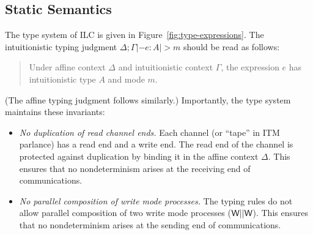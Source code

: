 %  

\subsection{Static Semantics}
\label{subsec:types}

%

The type system of ILC is given in Figure~\ref{fig:type-expressions}. The
intuitionistic typing judgment $\Delta ; \Gamma |- e : A |> m$ should be read as follows:
\begingroup
\addtolength\leftmargini{-.2in}
\begin{quote}
  Under affine context $\Delta$ and intuitionistic context $\Gamma$, the expression $e$
  has intuitionistic type $A$ and mode $m$.
\end{quote}
\endgroup
\noindent (The affine typing judgment follows similarly.) Importantly, the type
  system maintains these invariants:

\begin{comment}
Judgments have the form $\Delta ; \Gamma |- e : A |> m$, where $\Delta$ is an affine typing
context, $\Gamma$ is an intuitionistic typing context, and $m \in \{\Wm, \Rm, \Vm\}$ is
a mode (write, read, and value, respectively). Importantly, it maintains these
invariants:
\end{comment}

\begin{itemize}[leftmargin=*]
\item \emph{No duplication of read channel ends.} Each channel (or ``tape'' in
  ITM parlance) has a read end and a write end. The read end of the channel is
  protected against duplication by binding it in the affine context $\Delta$. This
  ensures that no nondeterminism arises at the receiving end of communications.

\item \emph{No parallel composition of write mode processes.} The typing rules
  do not allow parallel composition of two write mode processes ($\textsf{W} ||
  \textsf{W}$). This ensures that no nondeterminism arises at the sending end of
  communications.
\end{itemize}


